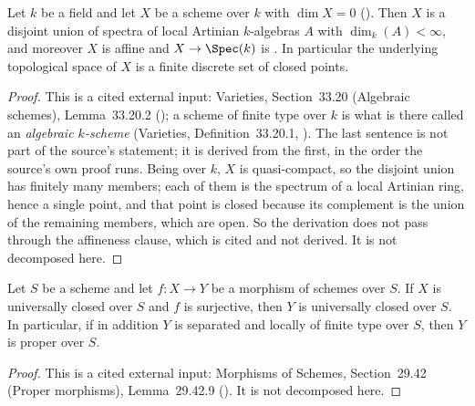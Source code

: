 \begin{lemma}
\label{lem:pc-dim-zero-finite}
Let $k$ be a field and let $X$ be a scheme
 over $k$ with
$\dim X=0$ ().  Then $X$ is a disjoint union of
spectra of local Artinian $k$-algebras $A$ with $\dim_k(A)<\infty$, and
moreover $X$ is affine and $X\to\Spec(k)$ is
.  In particular the underlying
topological space of $X$ is a finite discrete set of closed points.
\end{lemma}
\begin{proof}
This is a cited external input: Varieties, Section~33.20 (Algebraic schemes),
Lemma~33.20.2 (); a scheme of finite type over $k$ is
what is there called an \emph{algebraic $k$-scheme} (Varieties,
Definition~33.20.1, ).  The last sentence is not part of
the source's statement; it is derived from the first, in the order the
source's own proof runs.  Being
 over $k$, $X$ is
quasi-compact, so the disjoint union has finitely many members; each of them
is the spectrum of a local Artinian ring, hence a single point, and that point
is closed because its complement is the union of the remaining members, which
are open.  So the derivation does not pass through the affineness clause,
which is cited and not derived.  It is not decomposed
here.
\end{proof}

\begin{lemma}
\label{lem:pc-image-universally-closed}
Let $S$ be a scheme and let $f:X\to Y$ be a morphism of schemes over $S$.  If $X$ is
universally closed over $S$ and $f$ is surjective, then $Y$ is universally closed over $S$.
In particular, if in addition $Y$ is separated and locally of finite type over $S$, then $Y$
is proper over $S$.
\end{lemma}
\begin{proof}
This is a cited external input: Morphisms of Schemes, Section~29.42 (Proper morphisms),
Lemma~29.42.9 ().  It is not decomposed here.
\end{proof}

